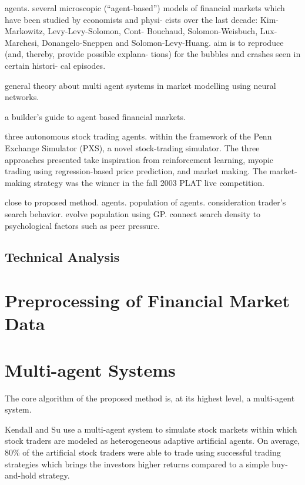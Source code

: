\cite{Bundesbank2007} agents. several microscopic (“agent-based”) models
of financial markets which have been studied by economists and physi- cists over
the last decade: Kim-Markowitz, Levy-Levy-Solomon, Cont- Bouchaud,
Solomon-Weisbuch, Lux-Marchesi, Donangelo-Sneppen and Solomon-Levy-Huang. aim is
to reproduce (and, thereby, provide possible explana- tions) for the bubbles and
crashes seen in certain histori- cal episodes.

\cite{Grothmann2002} general theory about multi agent systems in market
modelling using neural networks.

\cite{Lebaron2001} a builder's guide to agent based financial markets.



\cite{Sherstov2005} three autonomous stock trading agents. within the framework
of the Penn Exchange Simulator (PXS), a novel stock-trading simulator. The three
approaches presented take inspiration from reinforcement learning, myopic
trading using regression-based price prediction, and market making. The
market-making strategy was the winner in the fall 2003 PLAT live competition.

\cite{Chen2001} close to proposed method. agents. population of
agents. consideration trader's search behavior. evolve population using
GP. connect search density to psychological factors such as peer pressure.

\subsection{Technical Analysis}
\label{subsection:technical-analysis}

\section{Preprocessing of Financial Market Data}
\label{section:preprocessing-of-financial-market-data}

\section{Multi-agent Systems}
\label{section:multi-agent-systems}

The core algorithm of the proposed method is, at its highest level, a
multi-agent system.

Kendall and Su \cite{Kendall2003} use a multi-agent system to simulate stock
markets within which stock traders are modeled as heterogeneous adaptive
artificial agents. On average, 80\% of the artificial stock traders were able to
trade using successful trading strategies which brings the investors higher
returns compared to a simple buy-and-hold strategy.

